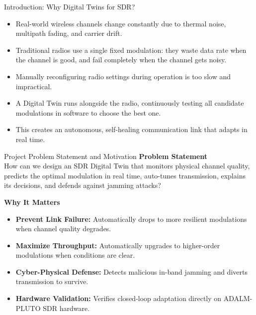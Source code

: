 \documentclass[aspectratio=169, 10pt]{beamer}
\begin{document}
\begin{frame}{Introduction: Why Digital Twins for SDR?}
  \begin{itemize}\setlength{\itemsep}{12pt}\normalsize
    \item Real-world wireless channels change constantly due to thermal noise, multipath fading, and carrier drift.
    \item Traditional radios use a single fixed modulation: they waste data rate when the channel is good, and fail completely when the channel gets noisy.
    \item Manually reconfiguring radio settings during operation is too slow and impractical.
    \item A Digital Twin runs alongside the radio, continuously testing all candidate modulations in software to choose the best one.
    \item This creates an autonomous, self-healing communication link that adapts in real time.
  \end{itemize}
\end{frame}

\begin{frame}{Project Problem Statement and Motivation}
  \textbf{\color{primaryblue}\large Problem Statement}\\[0.12cm]
  How can we design an SDR Digital Twin that monitors physical channel quality, predicts the optimal modulation in real time, auto-tunes transmission, explains its decisions, and defends against jamming attacks?
  
  \vspace{0.40cm}
  \textbf{\color{primaryblue}\large Why It Matters}\\[0.12cm]
  \begin{itemize}\setlength{\itemsep}{7pt}\small
    \item \textbf{Prevent Link Failure:} Automatically drops to more resilient modulations when channel quality degrades.
    \item \textbf{Maximize Throughput:} Automatically upgrades to higher-order modulations when conditions are clear.
    \item \textbf{Cyber-Physical Defense:} Detects malicious in-band jamming and diverts transmission to survive.
    \item \textbf{Hardware Validation:} Verifies closed-loop adaptation directly on ADALM-PLUTO SDR hardware.
  \end{itemize}
\end{frame}
\end{document}
